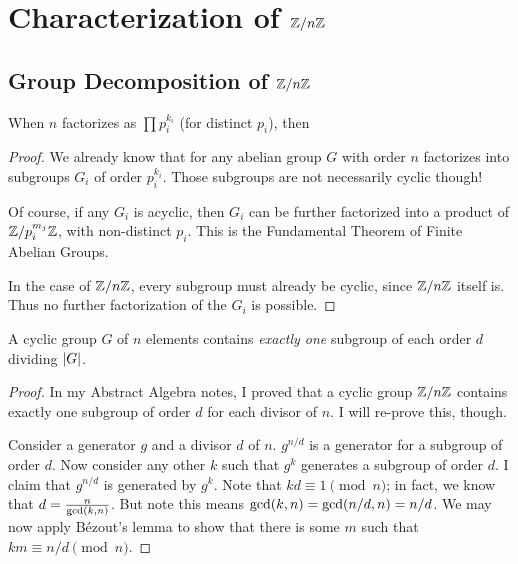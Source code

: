 \section{Characterization of $\mathbb{Z} / n\mathbb{Z}$}

\subsection{Group Decomposition of $\mathbb{Z} / n\mathbb{Z}$}

\begin{theorem}
  When $n$ factorizes as $\prod p_i^{k_i}$ (for distinct $p_i$), then

  \begin{nedqn}
    \Zmodn
  \congcol
    \times
    \cdots
    \times
  \end{nedqn}
\end{theorem}

\begin{proof}
  We already know that for any abelian group $G$ with order $n$
  factorizes into subgroups $G_i$ of order $p_i^{k_i}$. Those subgroups
  are not necessarily cyclic though!

  Of course, if any $G_i$ is acyclic, then $G_i$ can be further
  factorized into a product of $\mathbb{Z} / p_i^{m_j}\mathbb{Z}$, with non-distinct
  $p_i$. This is the Fundamental Theorem of Finite Abelian Groups.

  In the case of $\mathbb{Z} / n\mathbb{Z}$, every subgroup must already be cyclic, since
  $\mathbb{Z} / n\mathbb{Z}$ itself is. Thus no further factorization of the $G_i$ is
  possible.
\end{proof}

\begin{proposition}
  A cyclic group $G$ of $n$ elements contains \emph{exactly one}
  subgroup of each order $d$ dividing $|G|$.
\end{proposition}

\begin{proof}
  In my Abstract Algebra notes, I proved that a cyclic group $\mathbb{Z} / n\mathbb{Z}$
  contains exactly one subgroup of order $d$ for each divisor of $n$. I
  will re-prove this, though.

  Consider a generator $g$ and a divisor $d$ of $n$. $g^{n/d}$ is a
  generator for a subgroup of order $d$. Now consider any other $k$ such
  that $g^k$ generates a subgroup of order $d$. I claim that $g^{n/d}$
  is generated by $g^k$. Note that $kd \equiv 1 \pmod{n}$; in fact, we
  know that $d = \frac{n}{\gcd\mathopen{}\left( {k, n} \right)\mathclose{}}$. But note this means $\gcd\mathopen{}\left( {k,
  n} \right)\mathclose{} = \gcd\mathopen{}\left( {n/d, n} \right)\mathclose{} = n/d$. We may now apply Bézout's lemma to show
  that there is some $m$ such that $km \equiv n/d \pmod{n}$.
\end{proof}

